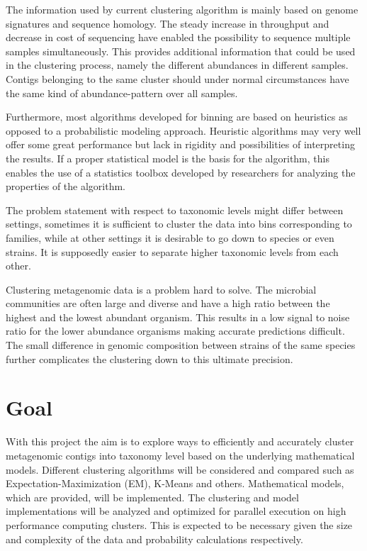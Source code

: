 \documentclass{article}
\begin{document}
The information used by current clustering algorithm is mainly based on genome signatures and sequence homology. The steady increase in throughput and decrease in cost of sequencing have enabled the possibility to sequence multiple samples simultaneously. This provides additional information that could be used in the clustering process, namely the different abundances in different samples. Contigs belonging to the same cluster should under normal circumstances have the same kind of abundance-pattern over all samples.

Furthermore, most algorithms developed for binning are based on heuristics as opposed to a probabilistic modeling approach. Heuristic algorithms may very well offer some great performance but lack in rigidity and possibilities of interpreting the results. If a proper statistical model is the basis for the algorithm, this enables the use of a statistics toolbox developed by researchers for analyzing the properties of the algorithm. 

The problem statement with respect to taxonomic levels might differ between settings, sometimes it is sufficient to cluster the data into bins corresponding to families, while at other settings it is desirable to go down to species or even strains. It is supposedly easier to separate higher taxonomic levels from each other. 

Clustering metagenomic data is a problem hard to solve. The microbial communities are often large and diverse and have a high ratio between the highest and the lowest abundant organism. This results in a low signal to noise ratio for the lower abundance organisms making accurate predictions difficult. The small difference in genomic composition between strains of the same species further complicates the clustering down to this ultimate precision.

\section*{Goal}

With this project the aim is to explore ways to efficiently and accurately cluster metagenomic contigs into taxonomy level based on the underlying mathematical models. Different clustering algorithms will be considered and compared such as Expectation-Maximization (EM), K-Means and others. Mathematical models, which are provided, will be implemented. The clustering and model implementations will be analyzed and optimized for parallel execution on high performance computing clusters. This is expected to be necessary given the size and complexity of the data and probability calculations respectively.
\end{document}
